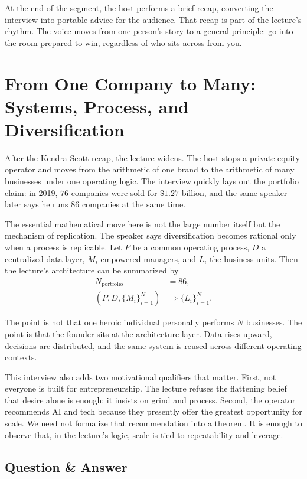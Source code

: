 At the end of the segment, the host performs a brief recap, converting the interview into portable advice for the audience. That recap is part of the lecture's rhythm. The voice moves from one person's story to a general principle: go into the room prepared to win, regardless of who sits across from you.

\section{From One Company to Many: Systems, Process, and Diversification}

After the Kendra Scott recap, the lecture widens. The host stops a private-equity operator and moves from the arithmetic of one brand to the arithmetic of many businesses under one operating logic. The interview quickly lays out the portfolio claim: in 2019, \(76\) companies were sold for \(\$1.27\) billion, and the same speaker later says he runs \(86\) companies at the same time.

The essential mathematical move here is not the large number itself but the mechanism of replication. The speaker says diversification becomes rational only when a process is replicable. Let \(P\) be a common operating process, \(D\) a centralized data layer, \(M_i\) empowered managers, and \(L_i\) the business units. Then the lecture's architecture can be summarized by
\begin{align}
N_{\text{portfolio}} &= 86,\\
(P,D,\{M_i\}_{i=1}^N) &\Rightarrow \{L_i\}_{i=1}^N.
\end{align}

The point is not that one heroic individual personally performs \(N\) businesses. The point is that the founder sits at the architecture layer. Data rises upward, decisions are distributed, and the same system is reused across different operating contexts.

This interview also adds two motivational qualifiers that matter. First, not everyone is built for entrepreneurship. The lecture refuses the flattening belief that desire alone is enough; it insists on grind and process. Second, the operator recommends AI and tech because they presently offer the greatest opportunity for scale. We need not formalize that recommendation into a theorem. It is enough to observe that, in the lecture's logic, scale is tied to repeatability and leverage.

\subsection{Question \& Answer}

